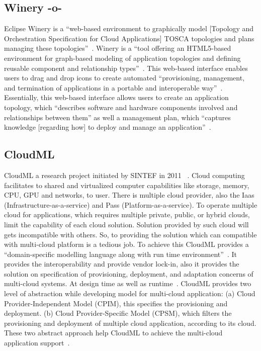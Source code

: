 \subsection{Winery -o-}

Eclipse Winery is a ``web-based environment to graphically model
[Topology and Orchestration Specification for Cloud Applications]
TOSCA topologies and plans managing these
topologies''~\cite{www-winery}. Winery is a ``tool offering an
HTML5-based environment for graph-based modeling of application
topologies and defining reusable component and relationship
types''~\cite{winery-paper-2013}. This web-based interface enables
users to drag and drop icons to create automated ``provisioning,
management, and termination of applications in a portable and
interoperable way''~\cite{winery-paper-2013}.  Essentially, this
web-based interface allows users to create an application topology,
which ``describes software and hardware components involved and
relationships between them'' as well a management plan, which
``captures knowledge [regarding how] to deploy and manage an
application''~\cite{winery-paper-2013}.

     \pv
     

\subsection{CloudML}
                                                            
CloudML a research project initiated by SINTEF in 2011
~\cite{www-cloudml}. Cloud computing facilitates to shared and
virtualized computer capabilities like storage, memory, CPU, GPU and
networks, to user. There is multiple cloud provider, also the Iaas
(Infrastructure-as-a-service) and Pass (Platform-as-a-service). To
operate multiple cloud for applications, which requires multiple
private, public, or hybrid clouds, limit the capability of each cloud
solution.  Solution provided by such cloud will gets incompatible with
others. So, to providing the solution which can compatible with
multi-cloud platform is a tedious job. To achieve this CloudML
provides a ``domain-specific modelling language along with run time
environment''~\cite{www-cloudml}. It provides the interoperability and
provide vendor lock-in, also it provides the solution on specification
of provisioning, deployment, and adaptation concerns of multi-cloud
systems. At design time as well as runtime~\cite{www-cloudml}.
CloudML provides two level of abstraction while developing model for
multi-cloud application: (a) Cloud Provider-Independent Model (CPIM),
this specifies the provisioning and deployment.  (b) Cloud
Provider-Specific Model (CPSM), which filters the provisioning and
deployment of multiple cloud application, according to its cloud.
These two abstract approach help CloudML to achieve the multi-cloud
application support~\cite{www-cloudmlwiki}.

